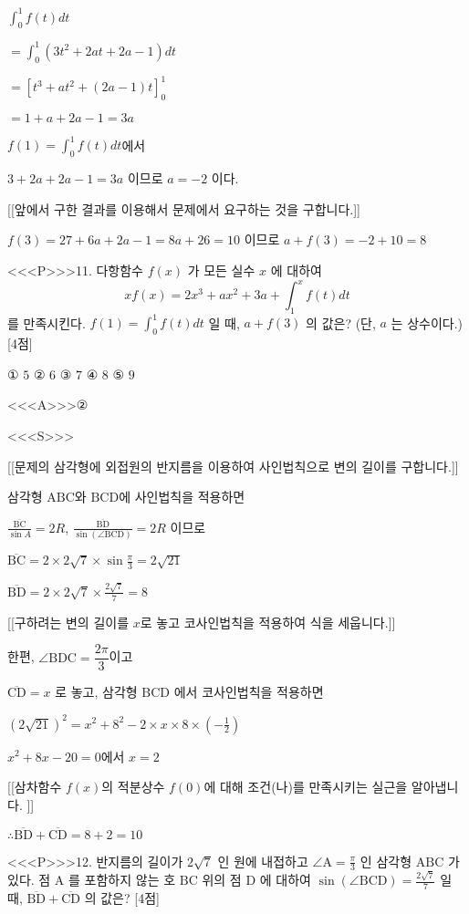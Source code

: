 \documentclass{oblivoir}
\begin{document}
$\int_{0}^{1} f(t) d t $

$=\int_{0}^{1}\left(3 t^{2}+2 a t+2 a-1\right) d t$

$=\left[t^{3}+a t^{2}+(2 a-1) t\right]_{0}^{1}$

$=1+a+2 a-1=3 a$

$f(1)=\int_{0}^{1} f(t) d t$에서

$3+2 a+2 a-1=3 a$ 이므로 $a=-2$ 이다.

[[앞에서 구한 결과를 이용해서 문제에서 요구하는 것을 구합니다.]]

$f(3)=27+6 a+2 a-1=8 a+26=10$ 이므로 $a+f(3)=-2+10=8$


<<<P>>>11. 다항함수 $f(x)$ 가 모든 실수 $x$ 에 대하여
$$
x f(x)=2 x^{3}+a x^{2}+3 a+\int_{1}^{x} f(t) d t
$$
를 만족시킨다. $f(1)=\int_{0}^{1} f(t) d t$ 일 때, $a+f(3)$ 의 값은? (단, $a$ 는 상수이다.) [4점]

① $5$
② $6$
③ $7$
④ $8$
⑤ $9$

<<<A>>>②

<<<S>>>

[[문제의 삼각형에 외접원의 반지름을 이용하여 사인법칙으로 변의 길이를 구합니다.]]

삼각형 $\mathrm{ABC}$와 $\mathrm{BCD}$에 사인법칙을 적용하면 

$\frac{\overline{\mathrm{BC}}}{\sin A}=2R$, $\frac{\overline{\mathrm{BD}}}{\sin (\angle \mathrm{BCD})} =2R$ 이므로

$\overline{\mathrm{BC}}=2 \times 2 \sqrt{7} \times \sin \frac{\pi}{3}=2 \sqrt{21}$

$\overline{\mathrm{BD}}=2 \times 2 \sqrt{7} \times \frac{2 \sqrt{7}}{7}=8$

[[구하려는 변의 길이를 $x$로 놓고 코사인법칙을 적용하여 식을 세웁니다.]]

한편, $ \angle \mathrm{BDC} = \dfrac{2\pi}{3}$이고

$\overline{\mathrm{CD}}=x$ 로 놓고, 삼각형 $\mathrm{BCD}$ 에서 코사인법칙을 적용하면

$ \left( 2 \sqrt{21} \right)^{2}=x^{2}+8^{2}-2 \times x \times 8 \times \left( -\frac{1}{2} \right)$

$x^{2}+8x-20=0$에서 $x=2$

[[삼차함수 $f(x)$의 적분상수 $f(0)$에 대해 조건(나)를 만족시키는 실근을 알아냅니다.  ]]

$\therefore \overline{\mathrm{BD}}+\overline{\mathrm{CD}}=8+2=10$


<<<P>>>12. 반지름의 길이가 $2 \sqrt{7}$ 인 원에 내접하고 $\angle \mathrm{A}=\frac{\pi}{3}$ 인 삼각형 $\mathrm{ABC}$ 가 있다. 점 $\mathrm{A}$ 를 포함하지 않는 호 $\mathrm{BC}$ 위의 점 $\mathrm{D}$ 에 대하여 $\sin (\angle \mathrm{BCD})=\frac{2 \sqrt{7}}{7}$ 일 때, $\overline{\mathrm{BD}}+\overline{\mathrm{CD}}$ 의 값은? [4점]
\end{document}
